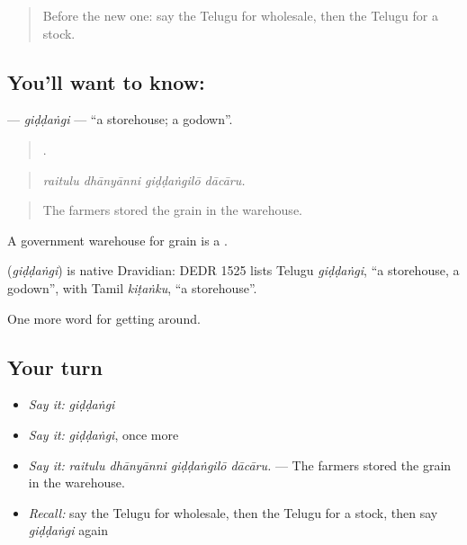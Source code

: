 \begin{quote}
Before the new one: say the Telugu for wholesale, then the Telugu for a stock.
\end{quote}

\subsection*{You'll want to know: }
\textbf{} — \emph{giḍḍaṅgi} — \textquotedblleft{}a storehouse; a godown\textquotedblright{}.

\begin{quote}
   .
\end{quote}

\begin{quote}
\emph{raitulu dhānyānni giḍḍaṅgilō dācāru.}
\end{quote}

\begin{quote}
The farmers stored the grain in the warehouse.
\end{quote}

A government warehouse for grain is a .

\begin{cousinweb}
\textbf{} (\emph{giḍḍaṅgi}) is native Dravidian: DEDR 1525 lists Telugu \emph{giḍḍaṅgi}, \textquotedblleft{}a storehouse, a godown\textquotedblright{}, with Tamil \emph{kiṭaṅku}, \textquotedblleft{}a storehouse\textquotedblright{}.
\end{cousinweb}

\begin{grammarlens}[title={What you've built}]
One more word for getting around.
\end{grammarlens}

\subsection*{Your turn}
\begin{itemize}
\raggedright
  \item \emph{Say it:} \emph{giḍḍaṅgi}
  \item \emph{Say it:} \emph{giḍḍaṅgi}, once more
  \item \emph{Say it:} \emph{raitulu dhānyānni giḍḍaṅgilō dācāru.} — The farmers stored the grain in the warehouse.
  \item \emph{Recall:} say the Telugu for wholesale, then the Telugu for a stock, then say \emph{giḍḍaṅgi} again
\end{itemize}

